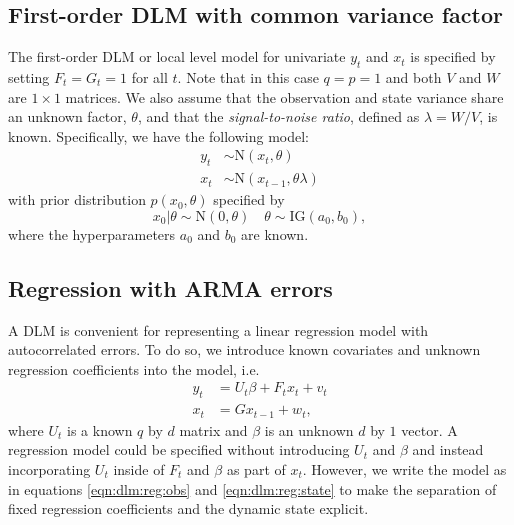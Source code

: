 \subsection{First-order DLM with common variance factor \label{sec:dlm:ll}}

The first-order DLM or local level model for univariate $y_t$ and $x_t$ is specified by setting $F_t = G_t = 1$ for all $t$. Note that in this case $q = p = 1$ and both $V$ and $W$ are $1 \times 1$ matrices. We also assume that the observation and state variance share an unknown factor, $\theta$, and that the \emph{signal-to-noise ratio}, defined as $\lambda = W / V$, is known. Specifically, we have the following model:
\begin{align}
y_t &\sim \mbox{N}(x_t, \theta) \label{eqn:ll:obs} \\
x_t &\sim \mbox{N}(x_{t-1}, \theta\lambda) \label{eqn:ll:state}
\end{align}
with prior distribution $p(x_0, \theta)$ specified by
\begin{equation}
x_0|\theta \sim \mbox{N}(0, \theta) \quad \theta \sim \mbox{IG}(a_0,b_0), \label{eqn:ll:prior}
\end{equation}
where the hyperparameters $a_0$ and $b_0$ are known.

\subsection{Regression with ARMA errors \label{sec:dlm:arma}}

A DLM is convenient for representing a linear regression model with autocorrelated errors. To do so, we introduce known covariates and unknown regression coefficients into the model, i.e.
\begin{align}
y_t &= U_t\beta + F_tx_t + v_t \label{eqn:dlm:reg:obs} \\
x_t &= Gx_{t-1} + w_t, \label{eqn:dlm:reg:state}
\end{align}
where $U_t$ is a known $q$ by $d$ matrix and $\beta$ is an unknown $d$ by $1$ vector. A regression model could be specified without introducing $U_t$ and $\beta$ and instead incorporating $U_t$ inside of $F_t$ and $\beta$ as part of $x_t$. However, we write the model as in equations \eqref{eqn:dlm:reg:obs} and \eqref{eqn:dlm:reg:state} to make the separation of fixed regression coefficients and the dynamic state explicit.

